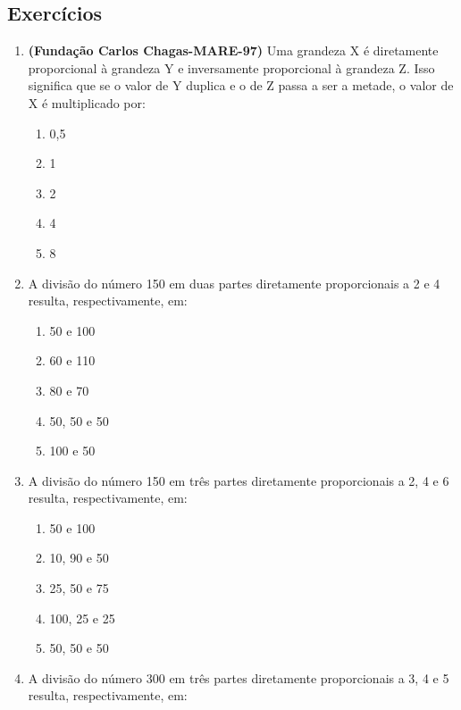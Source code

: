 \subsection{Exercícios}
\begin{multicols}{2}
\begin{enumerate}
\item \textbf{(Fundação Carlos Chagas-MARE-97)} Uma grandeza X é diretamente proporcional à grandeza Y e inversamente proporcional à grandeza Z. Isso significa que se o valor de Y duplica e o de Z passa a ser a metade, o valor de X é multiplicado por:

\begin{enumerate}

\item 0,5
\item 1
\item 2
\item 4
\item 8


\end{enumerate}

\item A divisão do número 150 em duas partes diretamente proporcionais a 2 e 4 resulta, respectivamente,  em:
\begin{enumerate}


\item 50 e 100
\item 60 e 110
\item 80 e 70
\item 50, 50 e 50
\item 100 e 50

\end{enumerate}
\item A divisão do número 150 em três partes diretamente proporcionais a 2, 4 e 6 resulta, respectivamente,  em:
\begin{enumerate}

\item 50 e 100
\item 10, 90 e 50
\item 25, 50 e 75
\item 100, 25 e 25
\item 50, 50 e 50


\end{enumerate}
\item A divisão do número 300 em três partes diretamente proporcionais a 3, 4 e 5 resulta, respectivamente,  em:
\begin{enumerate}


\end{enumerate}
\end{enumerate}
\end{multicols}
